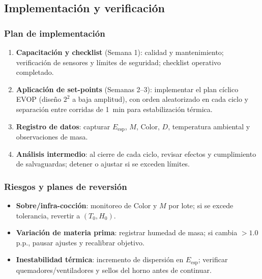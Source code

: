 \subsection{Implementación y verificación}

\subsubsection*{Plan de implementación}
\begin{enumerate}[left=0pt]
  \item \textbf{Capacitación y checklist} (Semana 1): calidad y mantenimiento; verificación de sensores y límites de seguridad; checklist operativo completado.
  \item \textbf{Aplicación de set-points} (Semanas 2--3): implementar el plan cíclico EVOP (diseño $2^2$ a baja amplitud), con orden aleatorizado en cada ciclo y separación entre corridas de {\SI{1}{\minute}} para estabilización térmica.
  \item \textbf{Registro de datos}: capturar $E_{\mathrm{esp}}$, $M$, Color, $D$, temperatura ambiental y observaciones de masa.
  \item \textbf{Análisis intermedio}: al cierre de cada ciclo, revisar efectos y cumplimiento de salvaguardas; detener o ajustar si se exceden límites.
\end{enumerate}

\subsubsection*{Riesgos y planes de reversión}
\begin{itemize}[left=0pt]
  \item \textbf{Sobre/infra-cocción}: monitoreo de Color y $M$ por lote; si se excede tolerancia, revertir a $(T_0,H_0)$.
  \item \textbf{Variación de materia prima}: registrar humedad de masa; si cambia $>{1{.}0}$ p.p., pausar ajustes y recalibrar objetivo.
  \item \textbf{Inestabilidad térmica}: incremento de dispersión en $E_{\mathrm{esp}}$; verificar quemadores/ventiladores y sellos del horno antes de continuar.
\end{itemize}

